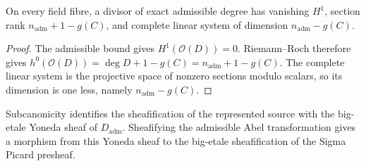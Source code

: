 \begin{theorem}
  \label{pa-thm:admissibleAbel_fibreRank}
  \leanok


  On every field fibre, a divisor of exact admissible degree has vanishing \(H^1\), section
  rank \(n_{\mathrm{adm}}+1-g(C)\), and complete linear system of dimension
  \(n_{\mathrm{adm}}-g(C)\).
\end{theorem}
\begin{proof}
  The admissible bound gives \(H^1(\mathcal O(D))=0\).  Riemann--Roch therefore gives
  \(h^0(\mathcal O(D))=\deg D+1-g(C)=n_{\mathrm{adm}}+1-g(C)\).  The complete linear
  system is the projective space of nonzero sections modulo scalars, so its dimension is one
  less, namely \(n_{\mathrm{adm}}-g(C)\).
\end{proof}

\begin{definition}
  \label{pa-def:admissibleAbelEtaleSheafMap}
  \leanok

  Subcanonicity identifies the sheafification of the represented source with the big-etale
  Yoneda sheaf of \(D_{\mathrm{adm}}\).  Sheafifying the admissible Abel transformation gives
  a morphism from this Yoneda sheaf to the big-etale sheafification of the Sigma Picard
  presheaf.
\end{definition}

